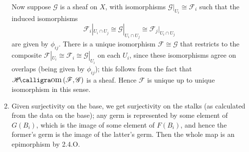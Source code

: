 \documentclass{report}
\newcommand{\scrF}{\mathscr{F}}
\newcommand{\scrG}{\mathscr{G}}
\DeclareMathOperator{\shHom}{\mathscr{H}\text{\kern -3pt {\calligra\large om}}\,}
\begin{document}
\begin{enumerate}[label=\textbf{2.5.\Alph*.}]
	      Now suppose $\scrG$ is a sheaf on $X$, with isomorphisms
	      $\scrG|_{U_i}\cong\scrF_i$ such that the induced isomorphisms
	      \begin{equation*}
		      \scrF_i|_{U_i\cap U_j}\cong\scrG|_{U_i\cap U_j}\cong\scrF_j|_{U_i\cap U_j}
	      \end{equation*}
	      are given by $\phi_{ij}$. There is a unique isomorphism
	      $\scrF\cong\scrG$ that restricts to the composite
	      $\scrF|_{U_i}\cong\scrF_i\cong\scrG|_{U_i}$ on each $U_i$, since these
	      isomorphisms agree on overlaps (being given by $\phi_{ij}$); this
	      follows from the fact that $\shHom(\scrF,\scrG)$ is a sheaf. Hence
	      $\scrF$ is unique up to unique isomorphism in this sense.

	\item Given surjectivity on the base, we get surjectivity on the stalks (as
	      calculated from the data on the base); any germ is represented by some
	      element of $G(B_i)$, which is the image of some element of $F(B_i)$, and
	      hence the former's germ is the image of the latter's germ. Then the
	      whole map is an epimorphism by 2.4.O.
\end{enumerate}
\end{document}
